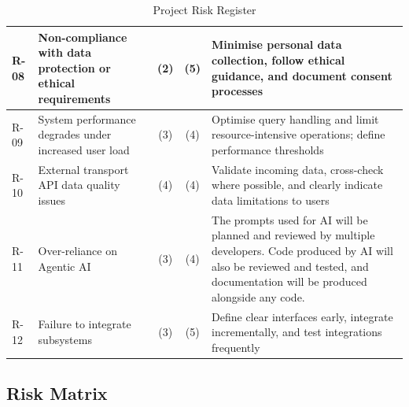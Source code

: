\documentclass{article}
\begin{document}
\begin{table}[h]
\begin{tabular}{|l|p{4cm}|c|c|p{8cm}|}
\hline

R-08 & Non-compliance with data protection or ethical requirements & (2) & (5) & Minimise personal data collection, follow ethical guidance, and document consent processes  \\

\hline

R-09 & System performance degrades under increased user load & (3) & (4) & Optimise query handling and limit resource-intensive operations; define performance thresholds  \\

\hline

R-10 & External transport API data quality issues & (4) & (4) & Validate incoming data, cross-check where possible, and clearly indicate data limitations to users  \\

\hline

R-11 & Over-reliance on Agentic AI & (3) & (4) & The prompts used for AI will be planned and reviewed by multiple developers. Code produced by AI will also be reviewed and tested, and documentation will be produced alongside any code. \\

\hline

R-12 & Failure to integrate subsystems  & (3) & (5) & Define clear interfaces early, integrate incrementally, and test integrations frequently  \\

\hline
\end{tabular}
\caption{Project Risk Register}
\end{table}

\newpage


\subsection{Risk Matrix}
\end{document}
